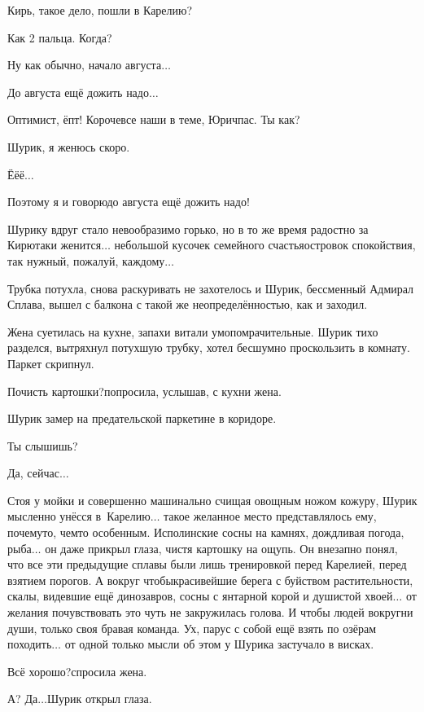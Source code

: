 {\diagdash Кирь, такое дело, пошли в Карелию?

\diagdash Как 2 пальца. Когда?

\diagdash Ну как обычно, начало августа$\ldots$

\diagdash До августа ещё дожить надо$\ldots$

\diagdash Оптимист, ёпт! Короче\mdash все наши в теме, Юрич\mdash пас. Ты как?

\diagdash Шурик, я женюсь скоро.

\diagdash Ё\sdash ё\sdash ё$\ldots$

\diagdash Поэтому я и говорю\mdash до августа ещё дожить надо!

Шурику вдруг стало невообразимо горько, но в то же время радостно за Кирю\mdash таки женится$\ldots$ небольшой кусочек семейного счастья\mdash островок спокойствия, так нужный, пожалуй, каждому$\ldots$ 

Трубка потухла, снова раскуривать не захотелось и Шурик, бессменный Адмирал Сплава, вышел с балкона с такой же неопределённостью, как и заходил.

Жена суетилась на кухне, запахи витали умопомрачительные. Шурик тихо разделся, вытряхнул потухшую трубку, хотел бесшумно проскользить в комнату. Паркет скрипнул. 

\diagdash Почисть картошки?\mdash попросила, услышав, с кухни жена.

Шурик замер на предательской паркетине в коридоре.

\diagdash Ты слышишь?

\diagdash Да, сейчас$\ldots$

Стоя у мойки и совершенно машинально счищая овощным ножом кожуру, Шурик мысленно унёсся в~Карелию$\ldots$ такое желанное место представлялось ему, почему\sdash то, чем\sdash то особенным. Исполинские сосны на камнях, дождливая погода, рыба$\ldots$ он даже прикрыл глаза, чистя картошку на ощупь. Он внезапно понял, что все эти предыдущие сплавы были лишь тренировкой перед Карелией, перед взятием порогов. А вокруг чтобы\mdash красивейшие берега с буйством растительности, скалы, видевшие ещё динозавров, сосны с янтарной корой и душистой хвоей$\ldots$ от желания почувствовать это чуть не закружилась голова. И чтобы людей вокруг\mdash ни души, только своя бравая команда. Ух, парус с собой ещё взять по озёрам походить$\ldots$ от одной только мысли об этом у Шурика застучало в висках.

\diagdash Всё хорошо?\mdash спросила жена.

\diagdash А? Да$\ldots$\mdash Шурик открыл глаза.

}
